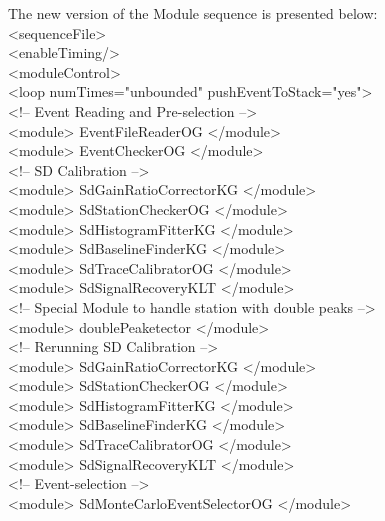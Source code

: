 The new version of the Module sequence is presented below:
\begingroup
  \selectfont \\ 
  \noindent <sequenceFile>\\
  \null\quad <enableTiming/>\\
  \null\quad <moduleControl>\\
  \null\qquad <loop numTimes="unbounded" pushEventToStack="yes"> \\
    \null\qquad \quad  <!-- Event Reading and Pre-selection -->\\
    \null\qquad \quad  <module> EventFileReaderOG </module>\\
    \null \qquad \quad  <module> EventCheckerOG </module>\\
    \null\qquad \quad  <!-- SD Calibration -->\\
    \null\qquad \quad   <module> SdGainRatioCorrectorKG </module>\\
    \null\qquad \quad   <module> SdStationCheckerOG </module>\\
    \null\qquad \quad   <module> SdHistogramFitterKG </module>\\
    \null\qquad \quad   <module> SdBaselineFinderKG </module>\\
    \null\qquad \quad   <module> SdTraceCalibratorOG </module>\\
    \null\qquad \quad   <module> SdSignalRecoveryKLT </module>\\
    \null\qquad \quad  <!-- Special Module to handle station with double peaks -->\\
    \null\qquad \quad   <module> doublePeaketector </module>\\
    \null\qquad \quad  <!-- Rerunning SD Calibration -->\\
    \null\qquad \quad   <module> SdGainRatioCorrectorKG </module>\\
    \null\qquad \quad   <module> SdStationCheckerOG </module>\\
    \null\qquad \quad   <module> SdHistogramFitterKG </module>\\
    \null\qquad \quad   <module> SdBaselineFinderKG </module>\\
    \null\qquad \quad   <module> SdTraceCalibratorOG </module>\\
    \null\qquad \quad   <module> SdSignalRecoveryKLT </module>\\
    \null\qquad \quad  <!-- Event-selection -->\\
    \null\qquad \quad   <module> SdMonteCarloEventSelectorOG </module>\\
